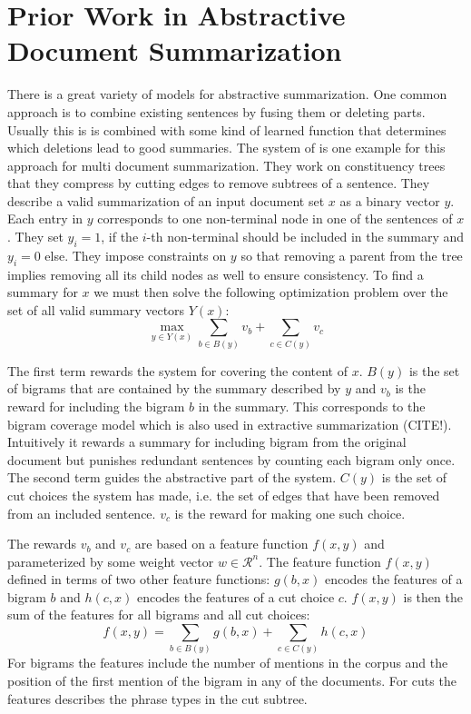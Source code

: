 \documentclass[a4paper,BCOR=10mm]{report}
\begin{document}
\section{Prior Work in Abstractive Document Summarization}

There is a great variety of models for abstractive summarization. One common approach is to combine existing sentences by fusing them or deleting parts. Usually this is is combined with some kind of learned function that determines which deletions lead to good summaries.
The system of \citet{berg-kirkpatrick} is one example for this approach for multi document summarization. They work on constituency trees that they compress by cutting edges to remove subtrees of a sentence.
They describe a valid summarization of an input document set $x$ as a binary vector $y$. Each entry in $y$ corresponds to one non-terminal node in one of the sentences of $x$. They set $y_i = 1$, if the $i$-th non-terminal should be included in the summary and $y_i = 0$ else. They impose constraints on $y$ so that removing a parent from the tree implies removing all its child nodes as well to ensure consistency.
To find a summary for $x$ we must then solve the following optimization problem over the set of all valid summary vectors $Y(x)$:
\begin{displaymath}
\max_{y \in Y(x)} \sum_{b \in B(y)} v_b + \sum_{c \in C(y)} v_c
\end{displaymath}

The first term rewards the system for covering the content of $x$. $B(y)$ is the set of bigrams that are contained by the summary described by $y$ and $v_b$ is the reward for including the bigram $b$ in the summary. This corresponds to the bigram coverage model which is also used in extractive summarization (CITE!). Intuitively it rewards a summary for including bigram from the original document but punishes redundant sentences by counting each bigram only once.
The second term guides the abstractive part of the system. $C(y)$ is the set of cut choices the system has made, i.e. the set of edges that have been removed from an included sentence. $v_c$ is the reward for making one such choice.

The rewards $v_b$ and $v_c$ are based on a feature function $f(x, y)$ and parameterized by some weight vector $w \in \mathcal{R}^n$.
The feature function $f(x, y)$ defined in terms of two other feature functions: $g(b, x)$ encodes the features of a bigram $b$ and $h(c, x)$ encodes the features of a cut choice $c$. $f(x, y)$ is then the sum of the features for all bigrams and all cut choices:
\begin{displaymath}
f(x, y) = \sum_{b \in B(y)} g(b, x) + \sum_{c \in C(y)} h(c, x)
\end{displaymath}
For bigrams the features include the number of mentions in the corpus and the position of the first mention of the bigram in any of the documents.
For cuts the features describes the phrase types in the cut subtree.
\end{document}
